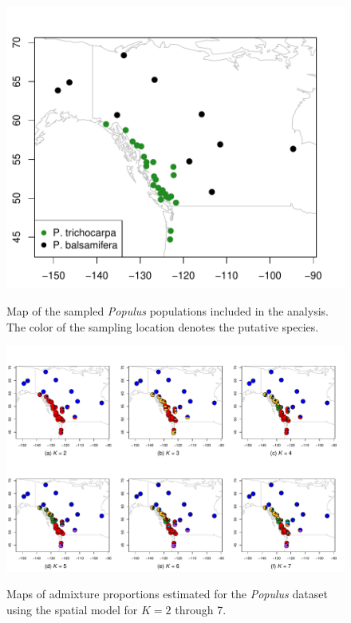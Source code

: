 \documentclass[10pt,letterpaper]{article}
\begin{document}
\begin{figure}
	\centering
		{\includegraphics[width=\textwidth]{figs/populus/populus_sampling_map.pdf}}
	\caption{
	Map of the sampled \textit{Populus} populations included in the analysis.
	The color of the sampling location denotes the putative species.
    }\label{populus_map}
\end{figure}

\begin{figure}
	\centering
		{\includegraphics[width=\textwidth]{figs/populus/populus_sp_pies.pdf}}
	\caption{
	Maps of admixture proportions estimated for the \textit{Populus} dataset 
	using the spatial model for $K=2$ through 7.
    }\label{populus_sp_pies}
\end{figure}
\end{document}
